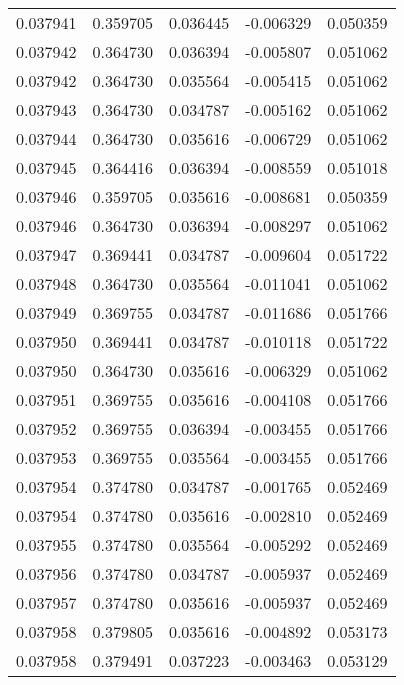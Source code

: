 \begin{tabular}{lrrrr}
0.037941    &  0.359705 &  0.036445 & -0.006329 &             0.050359 \\
0.037942    &  0.364730 &  0.036394 & -0.005807 &             0.051062 \\
0.037942    &  0.364730 &  0.035564 & -0.005415 &             0.051062 \\
0.037943    &  0.364730 &  0.034787 & -0.005162 &             0.051062 \\
0.037944    &  0.364730 &  0.035616 & -0.006729 &             0.051062 \\
0.037945    &  0.364416 &  0.036394 & -0.008559 &             0.051018 \\
0.037946    &  0.359705 &  0.035616 & -0.008681 &             0.050359 \\
0.037946    &  0.364730 &  0.036394 & -0.008297 &             0.051062 \\
0.037947    &  0.369441 &  0.034787 & -0.009604 &             0.051722 \\
0.037948    &  0.364730 &  0.035564 & -0.011041 &             0.051062 \\
0.037949    &  0.369755 &  0.034787 & -0.011686 &             0.051766 \\
0.037950    &  0.369441 &  0.034787 & -0.010118 &             0.051722 \\
0.037950    &  0.364730 &  0.035616 & -0.006329 &             0.051062 \\
0.037951    &  0.369755 &  0.035616 & -0.004108 &             0.051766 \\
0.037952    &  0.369755 &  0.036394 & -0.003455 &             0.051766 \\
0.037953    &  0.369755 &  0.035564 & -0.003455 &             0.051766 \\
0.037954    &  0.374780 &  0.034787 & -0.001765 &             0.052469 \\
0.037954    &  0.374780 &  0.035616 & -0.002810 &             0.052469 \\
0.037955    &  0.374780 &  0.035564 & -0.005292 &             0.052469 \\
0.037956    &  0.374780 &  0.034787 & -0.005937 &             0.052469 \\
0.037957    &  0.374780 &  0.035616 & -0.005937 &             0.052469 \\
0.037958    &  0.379805 &  0.035616 & -0.004892 &             0.053173 \\
0.037958    &  0.379491 &  0.037223 & -0.003463 &             0.053129 \\

\end{tabular}
